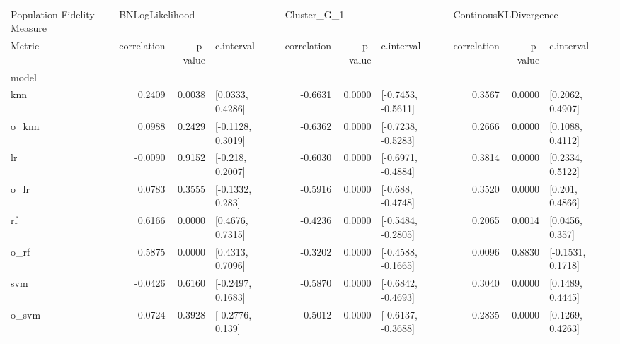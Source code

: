 \begin{tabular}{lrrlrrlrrl}
\toprule
Population Fidelity Measure & \multicolumn{3}{l}{BNLogLikelihood} & \multicolumn{3}{l}{Cluster\_G\_1} & \multicolumn{3}{l}{ContinousKLDivergence} \\
Metric &     correlation & p-value &         c.interval & correlation & p-value &          c.interval &           correlation & p-value &         c.interval \\
model &                 &         &                    &             &         &                     &                       &         &                    \\
\midrule
knn   &          0.2409 &  0.0038 &   [0.0333, 0.4286] &     -0.6631 &  0.0000 &  [-0.7453, -0.5611] &                0.3567 &  0.0000 &   [0.2062, 0.4907] \\
o\_knn &          0.0988 &  0.2429 &  [-0.1128, 0.3019] &     -0.6362 &  0.0000 &  [-0.7238, -0.5283] &                0.2666 &  0.0000 &   [0.1088, 0.4112] \\
lr    &         -0.0090 &  0.9152 &   [-0.218, 0.2007] &     -0.6030 &  0.0000 &  [-0.6971, -0.4884] &                0.3814 &  0.0000 &   [0.2334, 0.5122] \\
o\_lr  &          0.0783 &  0.3555 &   [-0.1332, 0.283] &     -0.5916 &  0.0000 &   [-0.688, -0.4748] &                0.3520 &  0.0000 &    [0.201, 0.4866] \\
rf    &          0.6166 &  0.0000 &   [0.4676, 0.7315] &     -0.4236 &  0.0000 &  [-0.5484, -0.2805] &                0.2065 &  0.0014 &    [0.0456, 0.357] \\
o\_rf  &          0.5875 &  0.0000 &   [0.4313, 0.7096] &     -0.3202 &  0.0000 &  [-0.4588, -0.1665] &                0.0096 &  0.8830 &  [-0.1531, 0.1718] \\
svm   &         -0.0426 &  0.6160 &  [-0.2497, 0.1683] &     -0.5870 &  0.0000 &  [-0.6842, -0.4693] &                0.3040 &  0.0000 &   [0.1489, 0.4445] \\
o\_svm &         -0.0724 &  0.3928 &   [-0.2776, 0.139] &     -0.5012 &  0.0000 &  [-0.6137, -0.3688] &                0.2835 &  0.0000 &   [0.1269, 0.4263] \\
\bottomrule
\end{tabular}

